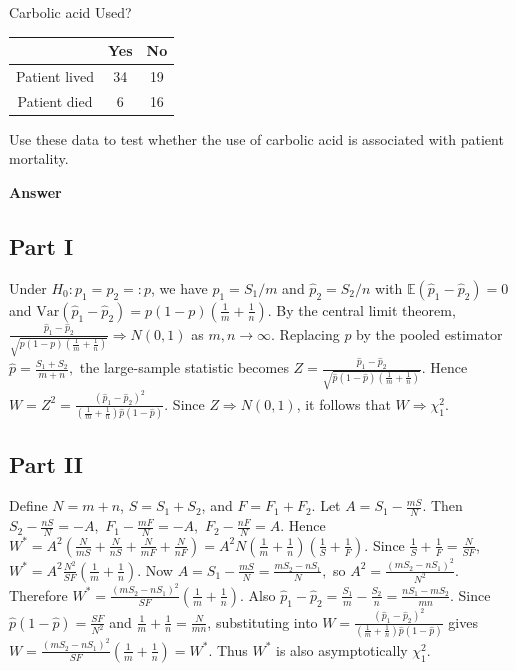 \documentclass[letterpaper]{article}
\begin{document}
\begin{enumerate}
			\begin{center}
				Carbolic acid Used?
				
				\begin{tabular}{c|c|c}
					& Yes & No \\
					\hline
					Patient lived & 34 & 19 \\
					Patient died & 6 & 16
				\end{tabular}
			\end{center}
			
			Use these data to test whether the use of carbolic acid is associated with patient mortality.
			
		\end{enumerate}
		
		
		\textbf{Answer}
		
		
		\subsection{Part I}
		Under $H_0:p_1=p_2=:p$, we have $\hat p_1=S_1/m$ and $\hat p_2=S_2/n$ with
		$\mathbb E(\hat p_1-\hat p_2)=0$ and
		$\mathrm{Var}(\hat p_1-\hat p_2)=p(1-p)\left(\frac1m+\frac1n\right)$.
		By the central limit theorem,
		$
		\frac{\hat p_1-\hat p_2}
		{\sqrt{p(1-p)\left(\frac1m+\frac1n\right)}}
		\Rightarrow N(0,1)
		$
		as $m,n\to\infty$.
		Replacing $p$ by the pooled estimator
		$
		\hat p=\frac{S_1+S_2}{m+n},
		$
		the large-sample statistic becomes
		$
		Z=\frac{\hat p_1-\hat p_2}
		{\sqrt{\hat p(1-\hat p)\left(\frac1m+\frac1n\right)}}.
		$
		Hence
		$
		W=Z^2=\frac{(\hat p_1-\hat p_2)^2}
		{\left(\frac1m+\frac1n\right)\hat p(1-\hat p)}.
		$
		Since $Z\Rightarrow N(0,1)$, it follows that $W\Rightarrow\chi^2_1$.
		
		\subsection{Part II}
		
		Define $N=m+n$, $S=S_1+S_2$, and $F=F_1+F_2$.
		Let $A=S_1-\frac{mS}{N}$. Then
		$
		S_2-\frac{nS}{N}=-A,
		$
		$
		F_1-\frac{mF}{N}=-A,
		$
		$
		F_2-\frac{nF}{N}=A.
		$
		Hence
		$
		W^*=A^2\!\left(\frac{N}{mS}+\frac{N}{nS}+\frac{N}{mF}+\frac{N}{nF}\right)
		= A^2N\!\left(\frac1m+\frac1n\right)\!\left(\frac1S+\frac1F\right).
		$
		Since $\frac1S+\frac1F=\frac{N}{SF}$,
		$
		W^*=A^2\frac{N^2}{SF}\left(\frac1m+\frac1n\right).
		$
		Now
		$
		A=S_1-\frac{mS}{N}=\frac{mS_2-nS_1}{N},
		$
		so
		$
		A^2=\frac{(mS_2-nS_1)^2}{N^2}.
		$
		Therefore
		$
		W^*=\frac{(mS_2-nS_1)^2}{SF}\left(\frac1m+\frac1n\right).
		$
		Also
		$
		\hat p_1-\hat p_2=\frac{S_1}{m}-\frac{S_2}{n}
		=\frac{nS_1-mS_2}{mn}.
		$
		Since $\hat p(1-\hat p)=\frac{SF}{N^2}$ and
		$\frac1m+\frac1n=\frac{N}{mn}$, substituting into
		$
		W=\frac{(\hat p_1-\hat p_2)^2}
		{\left(\frac1m+\frac1n\right)\hat p(1-\hat p)}
		$
		gives
		$
		W=\frac{(mS_2-nS_1)^2}{SF}\left(\frac1m+\frac1n\right)=W^*.
		$
		Thus $W^*$ is also asymptotically $\chi^2_1$.
		
\end{document}
